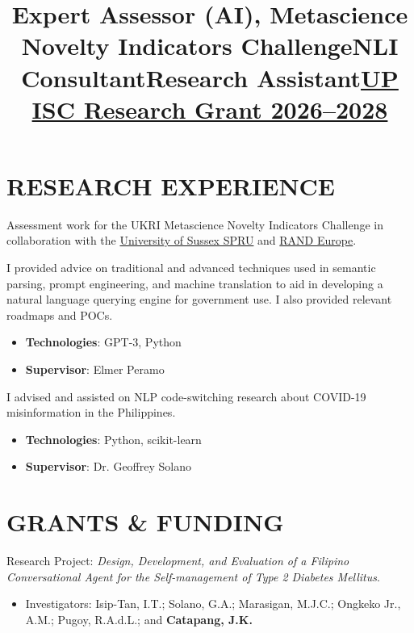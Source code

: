 \documentclass[margin]{res}
\begin{document}
\begin{resume}
\section{RESEARCH EXPERIENCE}
\title{\textbf{Expert Assessor (AI), Metascience Novelty Indicators Challenge}}
\begin{position}
Assessment work for the UKRI Metascience Novelty Indicators Challenge in collaboration with the \href{https://www.sussex.ac.uk/business-school/research/spru/}{University of Sussex SPRU} and \href{https://www.randeurope.org/}{RAND Europe}.
\end{position}
\title{\textbf{NLI Consultant}}
\begin{position}
I provided advice on traditional and advanced techniques used in semantic parsing, prompt engineering, and machine translation to aid in developing a natural language querying engine for government use. I also provided relevant roadmaps and POCs.
\begin{itemize}
    \item \textbf{Technologies}: GPT-3, Python
    \item \textbf{Supervisor}: Elmer Peramo
\end{itemize}
\end{position}
\title{\textbf{Research Assistant}}
\begin{position}
I advised and assisted on NLP code-switching research about COVID-19 misinformation in the Philippines.
\begin{itemize}
    \item \textbf{Technologies}: Python, scikit-learn
    \item \textbf{Supervisor}: Dr. Geoffrey Solano
\end{itemize}
\end{position}

\section{GRANTS \& FUNDING}
\title{\textbf{\href{https://isc.up.edu.ph/opportunities/research-grants-2025-26}{UP ISC Research Grant 2026--2028}}}
\begin{position}
Research Project: \textit{Design, Development, and Evaluation of a Filipino Conversational Agent for the Self-management of Type 2 Diabetes Mellitus}.
\begin{itemize}[noitemsep,topsep=0pt,parsep=0pt,partopsep=0pt]
    \item Investigators: Isip-Tan, I.T.; Solano, G.A.; Marasigan, M.J.C.; Ongkeko Jr., A.M.; Pugoy, R.A.d.L.; and \textbf{Catapang, J.K.}
\end{itemize}
\end{position}


\end{resume}
\end{document}
